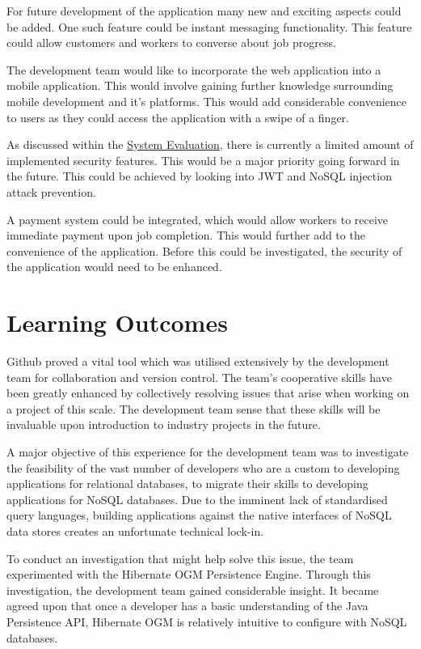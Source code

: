 For future development of the application many new and exciting aspects could be added. One such feature could be instant messaging functionality. This feature could allow customers and workers to converse about job progress.

The development team would like to incorporate the web application into a mobile application. This would involve gaining further knowledge surrounding mobile development and it's platforms. This would add considerable convenience to users as they could access the application with a swipe of a finger.


As discussed within the \hyperref[sec:SystemEvaluationLimitations]{\underline{System Evaluation}}, there is currently a limited amount of implemented security features. This would be a major priority going forward in the future. This could be achieved by looking into JWT and NoSQL injection attack prevention.

A payment system could be integrated, which would allow workers to receive immediate payment upon job completion. This would further add to the convenience of the application. Before this could be investigated, the security of the application would need to be enhanced.

\section{Learning Outcomes}
\label{sec:ConclusionLearningOutcomes}

Github proved a vital tool which was utilised extensively by the development team for collaboration and version control. The team's cooperative skills have been greatly enhanced by collectively resolving issues that arise when working on a project of this scale. The development team sense that these skills will be invaluable upon introduction to industry projects in the future.

\bigskip

A major objective of this experience for the development team was to investigate the feasibility of the vast number of developers who are a custom to developing applications for relational databases, to migrate their skills to developing applications for NoSQL databases. Due to the imminent lack of standardised query languages, building applications against the native interfaces of NoSQL data stores creates an unfortunate technical lock-in.

To conduct an investigation that might help solve this issue, the team experimented with the Hibernate OGM Persistence Engine. Through this investigation, the development team gained considerable insight. It became agreed upon that once a developer has a basic understanding of the Java Persistence API, Hibernate OGM is relatively intuitive to configure with NoSQL databases. 

